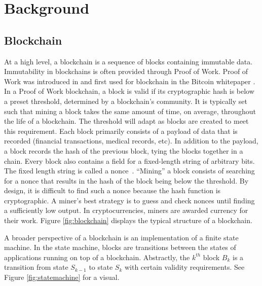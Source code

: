 \section{Background}
\label{sec:background}

\subsection{Blockchain}

At a high level, a blockchain is a sequence of blocks containing immutable data.
Immutability in blockchains is often provided through Proof of Work.
Proof of Work was introduced in \cite{dwork1992PoW} and first used for blockchain in the Bitcoin whitepaper \cite{nakamoto2009Bitcoin}.
In a Proof of Work blockchain, a block is valid if its cryptographic hash is below a preset threshold, determined by a blockchain's community.
It is typically set such that mining a block takes the same amount of time, on average, throughout the life of a blockchain.
The threshold will adapt as blocks are created to meet this requirement.
Each block primarily consists of a payload of data that is recorded (financial transactions, medical records, etc).
In addition to the payload, a block records the hash of the previous block, tying the blocks together in a chain.
Every block also contains a field for a fixed-length string of arbitrary bits.
The fixed length string is called a nonce~\cite{nakamoto2009Bitcoin}.
``Mining'' a block consists of searching for a nonce that results in the hash of the block being below the threshold.
By design, it is difficult to find such a nonce because the hash function is cryptographic.
A miner's best strategy is to guess and check nonces until finding a sufficiently low output.
In cryptocurrencies, miners are awarded currency for their work.
Figure \ref{fig:blockchain} displays the typical structure of a blockchain.



A broader perspective of a blockchain is an implementation of a finite state machine.
In the state machine, blocks are transitions between the states of applications running on top of a blockchain.
Abstractly, the $k^{th}$ block $B_k$ is a transition from state $S_{k-1}$ to state $S_k$ with certain validity requirements.
See Figure \ref{fig:statemachine} for a visual.



